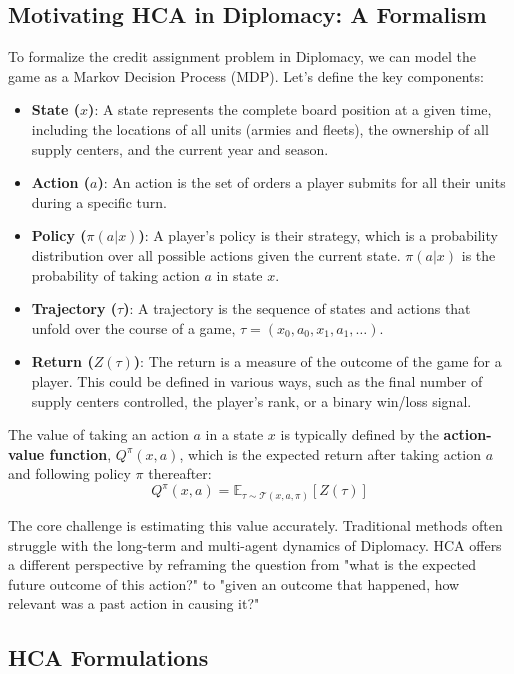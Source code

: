 \documentclass[oneside]{memoir}
\begin{document}
\subsection{Motivating HCA in Diplomacy: A Formalism}

To formalize the credit assignment problem in Diplomacy, we can model the game as a Markov Decision Process (MDP). Let's define the key components:

\begin{itemize}
    \item \textbf{State ($x$)}: A state represents the complete board position at a given time, including the locations of all units (armies and fleets), the ownership of all supply centers, and the current year and season.
    \item \textbf{Action ($a$)}: An action is the set of orders a player submits for all their units during a specific turn.
    \item \textbf{Policy ($\pi(a|x)$)}: A player's policy is their strategy, which is a probability distribution over all possible actions given the current state. $\pi(a|x)$ is the probability of taking action $a$ in state $x$.
    \item \textbf{Trajectory ($\tau$)}: A trajectory is the sequence of states and actions that unfold over the course of a game, $\tau = (x_0, a_0, x_1, a_1, \dots)$.
    \item \textbf{Return ($Z(\tau)$)}: The return is a measure of the outcome of the game for a player. This could be defined in various ways, such as the final number of supply centers controlled, the player's rank, or a binary win/loss signal.
\end{itemize}

The value of taking an action $a$ in a state $x$ is typically defined by the \textbf{action-value function}, $Q^{\pi}(x, a)$, which is the expected return after taking action $a$ and following policy $\pi$ thereafter:
$$
Q^{\pi}(x, a) = \mathbb{E}_{\tau \sim \mathcal{T}(x, a, \pi)}[Z(\tau)]
$$

The core challenge is estimating this value accurately. Traditional methods often struggle with the long-term and multi-agent dynamics of Diplomacy. HCA offers a different perspective by reframing the question from "what is the expected future outcome of this action?" to "given an outcome that happened, how relevant was a past action in causing it?"

\subsection{HCA Formulations}
\end{document}
